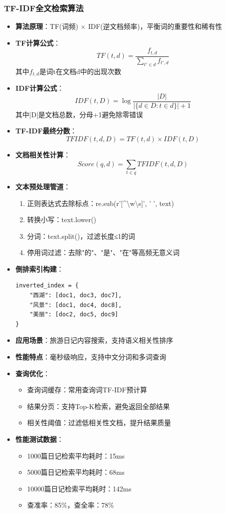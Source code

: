 \documentclass[12pt,a4paper]{article}
\begin{document}
\subsubsection{TF-IDF全文检索算法}
\begin{itemize}
    \item \textbf{算法原理}：TF(词频) × IDF(逆文档频率)，平衡词的重要性和稀有性
    \item \textbf{TF计算公式}：
    \[TF(t,d) = \frac{f_{t,d}}{\sum_{t' \in d} f_{t',d}}\]
    其中\(f_{t,d}\)是词t在文档d中的出现次数
    \item \textbf{IDF计算公式}：
    \[IDF(t,D) = \log \frac{|D|}{|\{d \in D : t \in d\}| + 1}\]
    其中|D|是文档总数，分母+1避免除零错误
    \item \textbf{TF-IDF最终分数}：
    \[TFIDF(t,d,D) = TF(t,d) \times IDF(t,D)\]
    \item \textbf{文档相关性计算}：
    \[Score(q,d) = \sum_{t \in q} TFIDF(t,d,D)\]
    \item \textbf{文本预处理管道}：
    \begin{enumerate}
        \item 正则表达式去除标点：re.sub(r'[^\textbackslash w\textbackslash s]', ' ', text)
        \item 转换小写：text.lower()
        \item 分词：text.split()，过滤长度≤1的词
        \item 停用词过滤：去除"的"、"是"、"在"等高频无意义词
    \end{enumerate}
    \item \textbf{倒排索引构建}：
    \begin{verbatim}
inverted_index = {
    "西湖": [doc1, doc3, doc7],
    "风景": [doc1, doc4, doc8],
    "美丽": [doc2, doc5, doc9]
}
    \end{verbatim}
    \item \textbf{应用场景}：旅游日记内容搜索，支持语义相关性排序
    \item \textbf{性能特点}：毫秒级响应，支持中文分词和多词查询
    \item \textbf{查询优化}：
    \begin{itemize}
        \item 查询词缓存：常用查询词TF-IDF预计算
        \item 结果分页：支持Top-K检索，避免返回全部结果
        \item 相关性阈值：过滤低相关性文档，提升结果质量
    \end{itemize}
    \item \textbf{性能测试数据}：
    \begin{itemize}
        \item 1000篇日记检索平均耗时：15ms
        \item 5000篇日记检索平均耗时：68ms
        \item 10000篇日记检索平均耗时：142ms
        \item 查准率：85\%，查全率：78\%
    \end{itemize}
\end{itemize}
\end{document}
